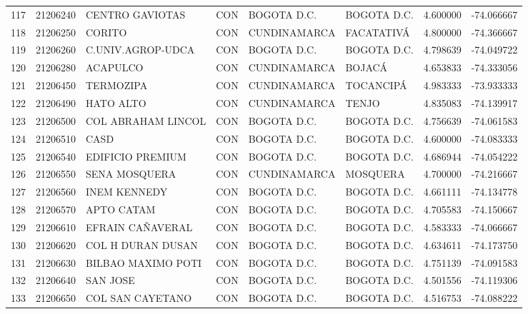 \documentclass[11pt]{article}
\begin{document}
\begin{table}
\begin{tabular}{lrllllrr}
117 &  21206240 &           CENTRO GAVIOTAS &  CON &   BOGOTA D.C. &       BOGOTA D.C. &  4.600000 & -74.066667 \\
118 &  21206250 &                   CORITO  &  CON &  CUNDINAMARCA &        FACATATIVÁ &  4.800000 & -74.366667 \\
119 &  21206260 &         C.UNIV.AGROP-UDCA &  CON &   BOGOTA D.C. &       BOGOTA D.C. &  4.798639 & -74.049722 \\
120 &  21206280 &                 ACAPULCO  &  CON &  CUNDINAMARCA &            BOJACÁ &  4.653833 & -74.333056 \\
121 &  21206450 &                TERMOZIPA  &  CON &  CUNDINAMARCA &         TOCANCIPÁ &  4.983333 & -73.933333 \\
122 &  21206490 &                HATO ALTO  &  CON &  CUNDINAMARCA &             TENJO &  4.835083 & -74.139917 \\
123 &  21206500 &        COL ABRAHAM LINCOL &  CON &   BOGOTA D.C. &       BOGOTA D.C. &  4.756639 & -74.061583 \\
124 &  21206510 &                     CASD  &  CON &   BOGOTA D.C. &       BOGOTA D.C. &  4.600000 & -74.083333 \\
125 &  21206540 &          EDIFICIO PREMIUM &  CON &   BOGOTA D.C. &       BOGOTA D.C. &  4.686944 & -74.054222 \\
126 &  21206550 &             SENA MOSQUERA &  CON &  CUNDINAMARCA &          MOSQUERA &  4.700000 & -74.216667 \\
127 &  21206560 &             INEM KENNEDY  &  CON &   BOGOTA D.C. &       BOGOTA D.C. &  4.661111 & -74.134778 \\
128 &  21206570 &               APTO CATAM  &  CON &   BOGOTA D.C. &       BOGOTA D.C. &  4.705583 & -74.150667 \\
129 &  21206610 &          EFRAIN CAÑAVERAL &  CON &   BOGOTA D.C. &       BOGOTA D.C. &  4.583333 & -74.066667 \\
130 &  21206620 &         COL H DURAN DUSAN &  CON &   BOGOTA D.C. &       BOGOTA D.C. &  4.634611 & -74.173750 \\
131 &  21206630 &        BILBAO MAXIMO POTI &  CON &   BOGOTA D.C. &       BOGOTA D.C. &  4.751139 & -74.091583 \\
132 &  21206640 &                 SAN JOSE  &  CON &   BOGOTA D.C. &       BOGOTA D.C. &  4.501556 & -74.119306 \\
133 &  21206650 &          COL SAN CAYETANO &  CON &   BOGOTA D.C. &       BOGOTA D.C. &  4.516753 & -74.088222 \\

\end{tabular}
\end{table}
\end{document}
